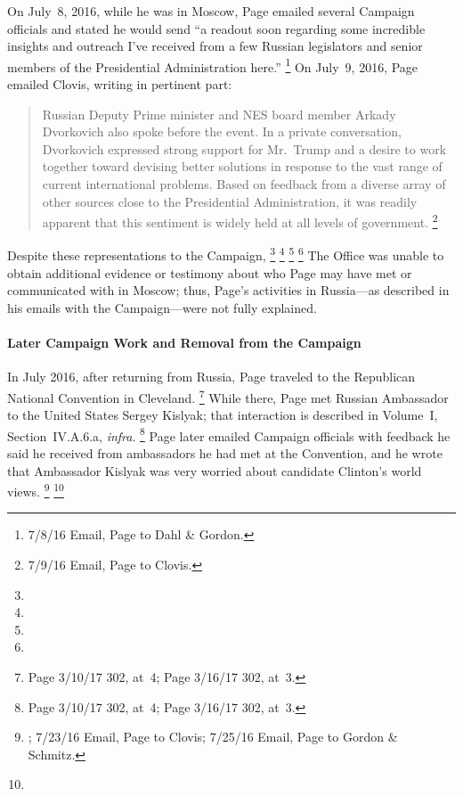 On July~8, 2016, while he was in Moscow, Page emailed several Campaign officials and stated he would send ``a readout soon regarding some incredible insights and outreach I've received from a few Russian legislators and senior members of the Presidential Administration here.''%
\footnote{ 7/8/16 Email, Page to Dahl \& Gordon.}
On July~9, 2016, Page emailed Clovis, writing in pertinent part:

\begin{quote}
Russian Deputy Prime minister and NES board member Arkady Dvorkovich also spoke before the event.
In a private conversation, Dvorkovich expressed strong support for Mr.~Trump and a desire to work together toward devising better solutions in response to the vast range of current international problems.
Based on feedback from a diverse array of other sources close to the Presidential Administration, it was readily apparent that this sentiment is widely held at all levels of government.%
\footnote{ 7/9/16 Email, Page to Clovis.}
\end{quote}

Despite these representations to the Campaign,
\footnote{}
\footnote{}
\footnote{}
\footnote{}
The Office was unable to obtain additional evidence or testimony about who Page may have met or communicated with in Moscow; thus, Page's activities in Russia---as described in his emails with the Campaign---were not fully explained.

\paragraph{Later Campaign Work and Removal from the Campaign}

In July 2016, after returning from Russia, Page traveled to the Republican National Convention in Cleveland.%
\footnote{Page 3/10/17 302, at~4;
Page 3/16/17 302, at~3.}
While there, Page met Russian Ambassador to the United States Sergey Kislyak; that interaction is described in Volume~I, Section~IV.A.6.a, \textit{infra}.%
\footnote{Page 3/10/17 302, at~4;
Page 3/16/17 302, at~3.}
Page later emailed Campaign officials with feedback he said he received from ambassadors he had met at the Convention, and he wrote that Ambassador Kislyak was very worried about candidate Clinton's world views.%
\footnote{; 7/23/16 Email, Page to Clovis;
7/25/16 Email, Page to Gordon \& Schmitz.}
\footnote{}

